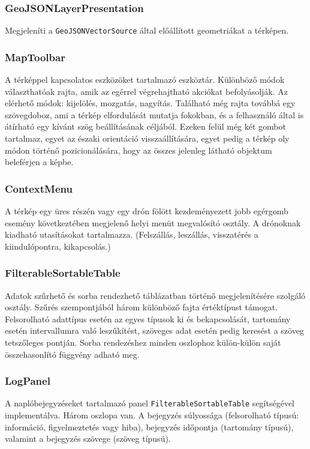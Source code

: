 \subsubsection{GeoJSONLayerPresentation}
Megjeleníti a \verb|GeoJSONVectorSource| által előállított geometriákat a
térképen.

\subsubsection{MapToolbar}
A térképpel kapcsolatos eszközöket tartalmazó eszköztár. Különböző módok
választhatóak rajta, amik az egérrel végrehajtható akciókat befolyásolják. Az
elérhető módok: kijelölés, mozgatás, nagyítás. Található még rajta továbbá egy
szövegdoboz, ami a térkép elfordulását mutatja fokokban, és a felhasználó által
is átírható egy kívánt szög beállításának céljából. Ezeken felül még két gombot
tartalmaz, egyet az északi orientáció visszaállítására, egyet pedig a térkép oly
módon történő pozicionálására, hogy az összes jelenleg látható objektum
beleférjen a képbe.

\subsubsection{ContextMenu}
A térkép egy üres részén vagy egy drón fölött kezdeményezett jobb egérgomb
esemény következtében megjelenő helyi menüt megvalósító osztály. A drónoknak
kiadható utasításokat tartalmazza. (Felszállás, leszállás, visszatérés a
kiindulópontra, kikapcsolás.)

\subsubsection{FilterableSortableTable}
Adatok szűrhető és sorba rendezhető táblázatban történő megjelenítésére szolgáló
osztály. Szűrés szempontjából három különböző fajta értéktípust támogat.
Felsorolható adattípus esetén az egyes típusok ki és bekapcsolását, tartomány
esetén intervallumra való leszűkítést, szöveges adat esetén pedig keresést a
szöveg tetszőleges pontján. Sorba rendezéshez minden oszlophoz külön-külön saját
összehasonlító függvény adható meg.

\subsubsection{LogPanel}

A naplóbejegyzéseket tartalmazó panel \verb|FilterableSortableTable|
segítségével implementálva. Három oszlopa van. A bejegyzés súlyossága
(felsorolható típusú: információ, figyelmeztetés vagy hiba), bejegyzés időpontja
(tartomány típusú), valamint a bejegyzés szövege (szöveg típusú).

